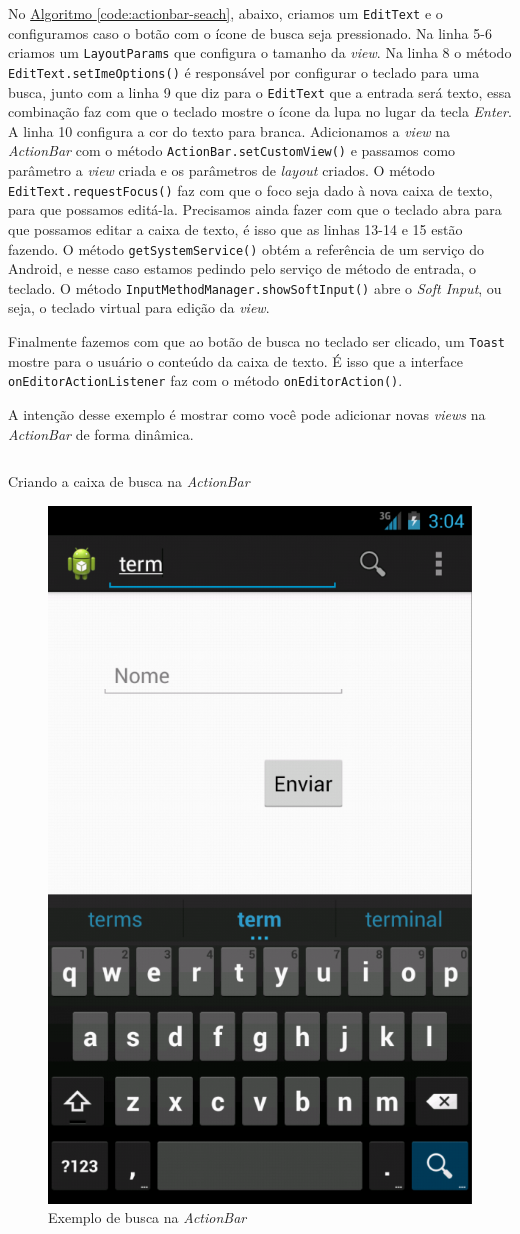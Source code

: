 \documentclass[a4paper,12pt,brazil,oneside]{book}
\begin{document}
		No \hyperref[code:actionbar-seach]{Algoritmo \ref*{code:actionbar-seach}}, abaixo, criamos um \texttt{EditText} e o configuramos caso o botão com o ícone de busca seja pressionado. Na linha 5-6 criamos um \texttt{LayoutParams} que configura o tamanho da \emph{view}. Na linha 8 o método \texttt{EditText.setImeOptions()} é responsável por configurar o teclado para uma busca, junto com a linha 9 que diz para o \texttt{EditText} que a entrada será texto, essa combinação faz com que o teclado mostre o ícone da lupa no lugar da tecla \emph{Enter}. A linha 10 configura a cor do texto para branca. Adicionamos a \emph{view} na \emph{ActionBar} com o método \texttt{ActionBar.setCustomView()} e passamos como parâmetro a \emph{view} criada e os parâmetros de \emph{layout} criados. O método \texttt{EditText.requestFocus()} faz com que o foco seja dado à nova caixa de texto, para que possamos editá-la. Precisamos ainda fazer com que o teclado abra para que possamos editar a caixa de texto, é isso que as linhas 13-14 e 15 estão fazendo. O método \texttt{getSystemService()} obtém a referência de um serviço do Android, e nesse caso estamos pedindo pelo serviço de método de entrada, o teclado. O método \texttt{InputMethodManager.showSoftInput()} abre o \emph{Soft Input}, ou seja, o teclado virtual para edição da \emph{view}. 
		
		Finalmente fazemos com que ao botão de busca no teclado ser clicado, um \texttt{Toast} mostre para o usuário o conteúdo da caixa de texto. É isso que a interface \texttt{onEditorActionListener} faz com o método \texttt{onEditorAction()}.
		
		A intenção desse exemplo é mostrar como você pode adicionar novas \emph{views} na \emph{ActionBar} de forma dinâmica.
		 
		\begin{listing}[H]
		\inputminted[linenos=true,fontsize=\small,frame=lines, framesep=2mm, tabsize=2,numbersep=5pt]{java}{src/design/actionbar-acao.java}
		\caption{Criando a caixa de busca na \emph{ActionBar}}
		\label{code:actionbar-seach}
		\end{listing}
		
		
	\begin{figure}[H]
	  \centering
	  \includegraphics[width=.3\textwidth]{figuras/design/actionbar-search.png}
	  \caption{Exemplo de busca na \emph{ActionBar}}
	  \label{fig:e20}
	\end{figure}
\end{document}
